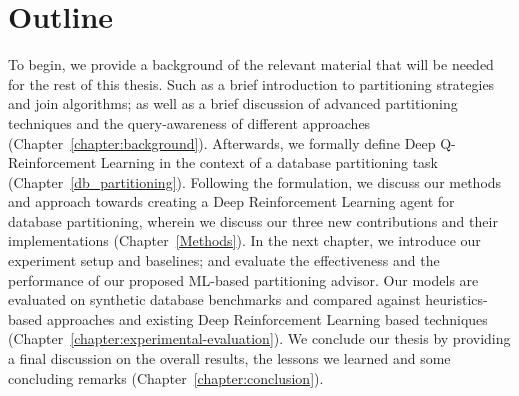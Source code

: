 \section{Outline}
To begin, we provide a background of the relevant material that will be needed for the rest of this thesis. Such as a brief introduction to partitioning strategies and join algorithms; as well as a brief discussion of advanced partitioning techniques and the query-awareness of different approaches (Chapter~\ref{chapter:background}). Afterwards, we formally define Deep Q-Reinforcement Learning in the context of a database partitioning task (Chapter~\ref{db_partitioning}).
Following the formulation, we discuss our methods and approach towards creating a Deep Reinforcement Learning agent for database partitioning, wherein we discuss our three new contributions and their implementations (Chapter~\ref{Methods}). In the next chapter, we introduce our experiment setup and baselines; and evaluate the effectiveness and the performance of our proposed ML-based partitioning advisor. Our models are evaluated on synthetic database benchmarks and compared against heuristics-based approaches and existing Deep Reinforcement Learning based techniques (Chapter~\ref{chapter:experimental-evaluation}).
We conclude our thesis by providing a final discussion on the overall results, the lessons we learned and some concluding remarks (Chapter~\ref{chapter:conclusion}).